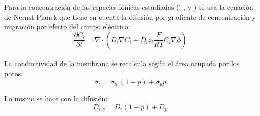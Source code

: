 \documentclass[a0,portrait]{a0poster}
\begin{document}
\begin{multicols}{2}
	




	Para la concentración de las especies iónicas estudiadas (\h, \oh, \na y \cl) se usa la ecuación de Nernst-Planck que tiene en cuenta la difusión por gradiente de concentración y migración por efecto del campo eléctrico:
	\begin{equation}
		\frac{\partial C_i}{\partial t} = \nabla \cdot \left( D_i \nabla C_i + D_i z_i 
			\frac{F}{R T} C_i \nabla \phi \right)
	\end{equation}\\			

	La conductividad de la membrana se recalcula según el área ocupada por los poros:
	\begin{equation}
		\sigma_{e} = \sigma_m (1 - p) + \sigma_p p
	\end{equation}

	Lo mismo se hace con la difusión:
	\begin{equation}
		D_{i, e} = D_i (1 - p) + D_p
	\end{equation}



\end{multicols}
\end{document}
